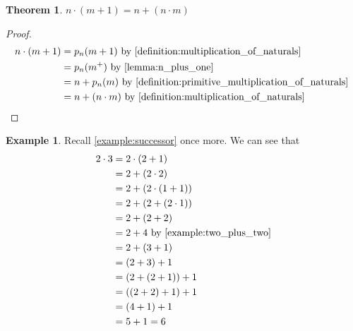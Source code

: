 \documentclass{article}
\theoremstyle{definition}
\theoremstyle{definition}
\newtheorem{example}{Example}[section]
\theoremstyle{plain}
\theoremstyle{remark}
\theoremstyle{plain}
\newtheorem{theorem}{Theorem}[section]
\theoremstyle{remark}
\theoremstyle{plain}
\theoremstyle{plain}
\theoremstyle{plain}
\theoremstyle{plain}
\begin{document}
\begin{theorem}
  \( n \cdot (m + 1) = n + (n \cdot m) \)
\end{theorem}

\begin{proof}
  \begin{align*}
    n \cdot (m+1) &= p_n(m+1)  
                     \text{
                       by \autoref{definition:multiplication_of_naturals}
                     } \\
                  &= p_n(m^{+})
                     \text{
                       by \autoref{lemma:n_plus_one}
                     } \\
                  &= n + p_n(m)
                     \text{
                       by \autoref{%
                            definition:primitive_multiplication_of_naturals%
                          }
                     } \\
                  &= n + (n \cdot m)
                     \text{
                       by \autoref{%
                            definition:multiplication_of_naturals%
                          }
                     } \\
  \end{align*}
\end{proof}

\begin{example}
  Recall \autoref{example:successor} once more. We can see that 
  \begin{align*}
    2 \cdot 3 &= 2 \cdot (2 + 1) \\
              &= 2 + (2 \cdot 2) \\
              &= 2 + (2 \cdot (1 + 1)) \\
              &= 2 + (2 + (2 \cdot 1 )) \\
              &= 2 + (2 + 2) \\
              &= 2 + 4 \text{ by \autoref{example:two_plus_two}} \\
              &= 2 + (3 + 1) \\
              &= (2 + 3) + 1 \\
              &= (2 + (2 + 1)) + 1 \\
              &= ((2 + 2) + 1) + 1 \\
              &= (4 + 1) + 1 \\
              &= 5 + 1 = 6 
  \end{align*}
\end{example}



\end{document}
